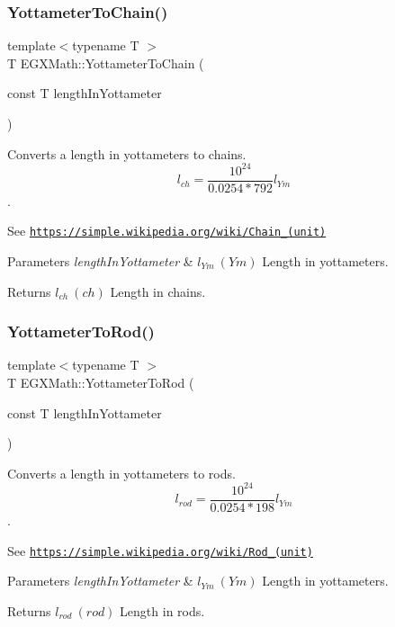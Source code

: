 \subsubsection{\texorpdfstring{Yottameter\+To\+Chain()}{YottameterToChain()}}
{\footnotesize\ttfamily template$<$typename T $>$ \\
T E\+G\+X\+Math\+::\+Yottameter\+To\+Chain (\begin{DoxyParamCaption}\item[{const T}]{length\+In\+Yottameter }\end{DoxyParamCaption})}



Converts a length in yottameters to chains. \[ l_{ch}= \frac{10^{24}}{0.0254 * 792} l_{Ym} \]. 

See \href{https://simple.wikipedia.org/wiki/Chain_(unit)}{\tt https\+://simple.\+wikipedia.\+org/wiki/\+Chain\+\_\+(unit)} 
\begin{DoxyParams}{Parameters}
{\em length\+In\+Yottameter} & $ l_{Ym}\ (Ym)$ Length in yottameters. \\
\hline
\end{DoxyParams}
\begin{DoxyReturn}{Returns}
$ l_{ch}\ (ch)$ Length in chains. 
\end{DoxyReturn}
\mbox{\label{group___e_g_x_math-_conversions-_length_conversions-_yottameter-_surveyors_ga877c3000c23a08dc1bcd3c4359482356}} 
\subsubsection{\texorpdfstring{Yottameter\+To\+Rod()}{YottameterToRod()}}
{\footnotesize\ttfamily template$<$typename T $>$ \\
T E\+G\+X\+Math\+::\+Yottameter\+To\+Rod (\begin{DoxyParamCaption}\item[{const T}]{length\+In\+Yottameter }\end{DoxyParamCaption})}



Converts a length in yottameters to rods. \[ l_{rod}= \frac{10^{24}}{0.0254 * 198} l_{Ym} \]. 

See \href{https://simple.wikipedia.org/wiki/Rod_(unit)}{\tt https\+://simple.\+wikipedia.\+org/wiki/\+Rod\+\_\+(unit)} 
\begin{DoxyParams}{Parameters}
{\em length\+In\+Yottameter} & $ l_{Ym}\ (Ym)$ Length in yottameters. \\
\hline
\end{DoxyParams}
\begin{DoxyReturn}{Returns}
$ l_{rod}\ (rod)$ Length in rods. 
\end{DoxyReturn}
